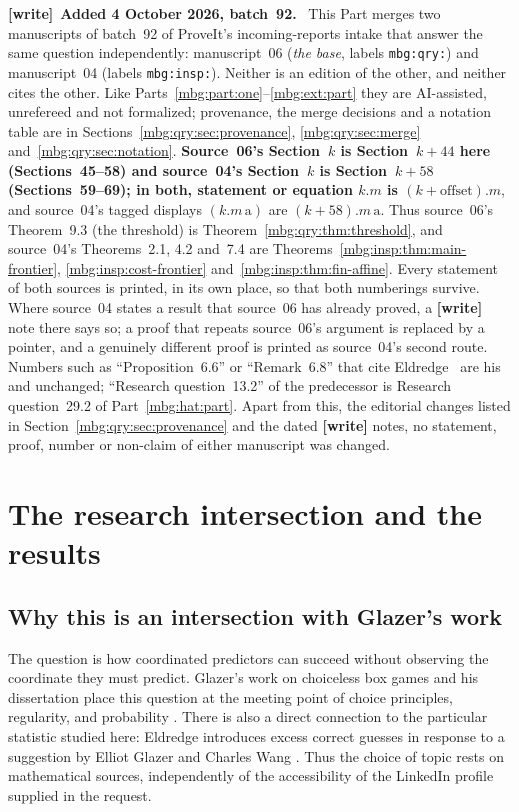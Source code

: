 \documentclass[11pt,letterpaper]{article}
\theoremstyle{definition}
\newenvironment{writenote}[1][]{\par\smallskip\begingroup\small
 \noindent\textbf{[write]}\if\relax\detokenize{#1}\relax\else~\textbf{#1.}\fi\ }%
 {\par\endgroup\smallskip}
\begin{document}
\begin{writenote}[Added 4 October 2026, batch~92]
This Part merges two manuscripts of batch~92 of ProveIt's incoming-reports intake that answer the same question independently: manuscript~06 (\emph{the base}, labels \texttt{mbg:qry:}) and manuscript~04 (labels \texttt{mbg:insp:}). Neither is an edition of the other, and neither cites the other. Like Parts~\ref{mbg:part:one}--\ref{mbg:ext:part} they are AI-assisted, unrefereed and not formalized; provenance, the merge decisions and a notation table are in Sections~\ref{mbg:qry:sec:provenance}, \ref{mbg:qry:sec:merge} and~\ref{mbg:qry:sec:notation}. \textbf{Source~06's Section~$k$ is Section~$k+44$ here (Sections~45--58) and source~04's Section~$k$ is Section~$k+58$ (Sections~59--69); in both, statement or equation $k.m$ is $(k+\text{offset}).m$}, and source~04's tagged displays $(k.m\,\mathrm a)$ are $(k+58).m\,\mathrm a$. Thus source~06's Theorem~9.3 (the threshold) is Theorem~\ref{mbg:qry:thm:threshold}, and source~04's Theorems~2.1, 4.2 and~7.4 are Theorems~\ref{mbg:insp:thm:main-frontier}, \ref{mbg:insp:cost-frontier} and~\ref{mbg:insp:thm:fin-affine}. Every statement of both sources is printed, in its own place, so that both numberings survive. Where source~04 states a result that source~06 has already proved, a \textbf{[write]} note there says so; a proof that repeats source~06's argument is replaced by a pointer, and a genuinely different proof is printed as source~04's second route. Numbers such as ``Proposition~6.6'' or ``Remark~6.8'' that cite Eldredge~\cite{hat:Eldredge} are his and unchanged; ``Research question~13.2'' of the predecessor is Research question~29.2 of Part~\ref{mbg:hat:part}. Apart from this, the editorial changes listed in Section~\ref{mbg:qry:sec:provenance} and the dated \textbf{[write]} notes, no statement, proof, number or non-claim of either manuscript was changed.
\end{writenote}

\section{The research intersection and the results}
\label{mbg:qry:sec:introduction}

\subsection{Why this is an intersection with Glazer's work}

The question is how coordinated predictors can succeed without observing
the coordinate they must predict. Glazer's work on choiceless box games
and his dissertation place this question at the meeting point of choice
principles, regularity, and probability \cite{GlazerBox,ext:GlazerThesis}.
There is also a direct connection to the particular statistic studied here:
Eldredge introduces excess correct guesses in response to a suggestion
by Elliot Glazer and Charles Wang \cite[p.~14]{hat:Eldredge}.
Thus the choice of topic rests on mathematical sources, independently of
the accessibility of the LinkedIn profile supplied in the request.
\end{document}

